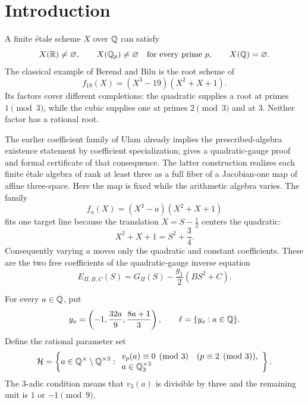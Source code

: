\section{Introduction}

A finite \'etale scheme \(X\) over \(\mathbb Q\) can satisfy
\begin{equation}
 X(\mathbb R)\ne\varnothing,\qquad X(\mathbb Q_p)\ne\varnothing\quad\text{for every prime }p,
 \qquad X(\mathbb Q)=\varnothing.
 \label{eq:hasse-condition}
\end{equation}
The classical example of Berend and Bilu
\cite{BerendBilu} is the root scheme of
\begin{equation}
 f_{19}(X)=(X^3-19)(X^2+X+1).
 \label{eq:berend-bilu}
\end{equation}
Its factors cover different completions: the quadratic supplies a root at
primes \(1\pmod3\), while the cubic supplies one at primes \(2\pmod3\)
and at \(3\). Neither factor has a rational root.

The earlier coefficient family of Ulam \cite[Theorem~5.2]{Ulam} already
implies the prescribed-algebra existence statement by coefficient
specialization; \cite{vanRijnFibers} gives a quadratic-gauge proof and formal
certificate of that consequence. The latter construction realizes each
finite \'etale algebra of rank at least three as a full fiber of a
Jacobian-one map of affine three-space. Here the map is fixed while the
arithmetic algebra varies. The family
\begin{equation}
 f_a(X)=(X^3-a)(X^2+X+1)
 \label{eq:intersective-family}
\end{equation}
fits one target line because the translation \(X=S-\tfrac12\) centers the
quadratic:
\begin{equation}
 X^2+X+1=S^2+\frac34.
 \label{eq:centered-quadratic-intro}
\end{equation}
Consequently varying \(a\) moves only the quadratic and constant
coefficients. These are the two free coefficients of the quadratic-gauge
inverse equation
\begin{equation}
 E_{\Pi,B,C}(S)=G_\Pi(S)-\frac{g_1}{2}(BS^2+C).
 \label{eq:inverse-intro}
\end{equation}

For every \(a\in\mathbb Q\), put
\begin{equation}
 y_a=\left(-1,\frac{32a}{9},\frac{8a+1}{3}\right),
 \qquad \ell=\{y_a:a\in\mathbb Q\}.
 \label{eq:target-family}
\end{equation}
Define the rational parameter set
\begin{equation}
 \mathcal H=\left\{a\in\mathbb Q^\times\setminus\mathbb Q^{\times3}:
 \begin{array}{l}
 v_p(a)\equiv0\pmod3\quad(p\equiv2\pmod3),\\
 a\in\mathbb Q_3^{\times3}
 \end{array}\right\}.
 \label{eq:rational-family}
\end{equation}
The \(3\)-adic condition means that \(v_3(a)\) is divisible by three and
the remaining unit is \(1\) or \(-1\pmod9\).

